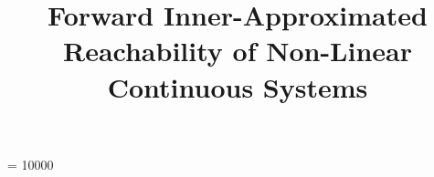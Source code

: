 \documentclass{sig-alternate-05-2015}
\def\N{{\mathbb N}}
\def\R{{\mathbb R}}
\newcommand{\vv}{{\bf v}}
\def\F{{\Bbb F}}
\def\A{{\Bbb A}}
\def\I{{\Bbb I \Bbb R}}
\def\K{{\Bbb I \Bbb K}}
\begin{document}


\widowpenalty = 10000


\def\transpose#1{{}^t \! #1}
\def\bfm#1{\protect{\makebox{\boldmath $#1$}}}
\def\a {\bfm{a}}
\def\b {\bfm{b}}
\def\c {\bfm{c}}
\def\d {\bfm{d}}
\def\e {\bfm{e}}
\def\f {\bfm{f}}
\def\g {\bfm{g}}
\def\h {\bfm{h}}
\def\ii {\bfm{i}}       %
\def\j {\bfm{j}}
\def\k {\bfm{k}}
\def\l {\bfm{l}}
\def\m {\bfm{m}}
\def\n {\bfm{n}}
\def\o {\bfm{o}}
\def\p {\bfm{p}}
\def\q {\bfm{q}}
\def\r {\bfm{r}}
\def\s {\bfm{s}}
\def\t {\bfm{t}}
\def\u {\bfm{u}}
\def\vv {\bfm{v}}       %
\def\w {\bfm{w}}
\def\x {\bfm{x}}
\def\y {\bfm{y}}
\def\z {\bfm{z}}
\def\B {\bfm{B}}
\def\C {\bfm{C}}
\def\DD{\bfm{D}}        %
\def\E {\bfm{E}}
\def\G {\bfm{G}}
\def\H {\bfm{H}}
\def\J {\bfm{J}}
\def\L {\bfm{L}}
\def\M {\bfm{M}}
\def\N {\bfm{N}}
\def\O {\bfm{O}}
\def\P {\bfm{P}}
\def\Q {\bfm{Q}}
\def\S {\bfm{S}}
\def\T {\bfm{T}}
\def\U {\bfm{U}}
\def\V {\bfm{V}}
\def\W {\bfm{W}}
\def\X {\bfm{X}}
\def\Y {\bfm{Y}}


\title{Forward Inner-Approximated Reachability  of Non-Linear Continuous Systems}
%
%
%
%
%
\end{document}

